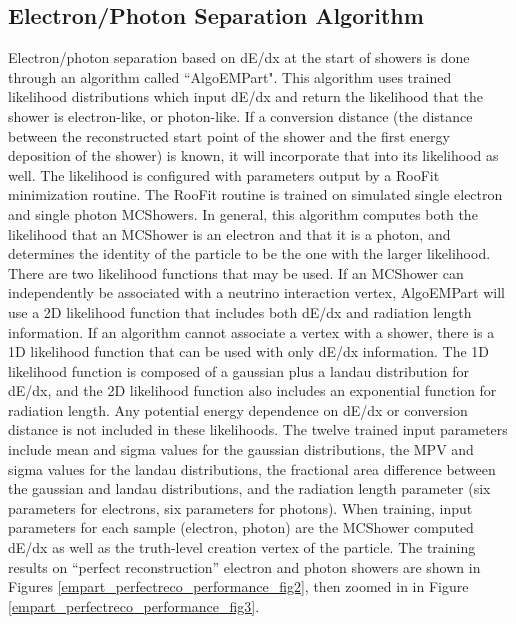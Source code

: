 \subsection{Electron/Photon Separation Algorithm}\label{algoempart_section}
Electron/photon separation based on dE/dx at the start of showers is done through an algorithm called ``AlgoEMPart". This algorithm uses trained likelihood distributions which input dE/dx and return the likelihood that the shower is electron-like, or photon-like. If a conversion distance (the distance between the reconstructed start point of the shower and the first energy deposition of the shower) is known, it will incorporate that into its likelihood as well. The likelihood is configured with parameters output by a RooFit \cite{ROOFITsource} minimization routine. The RooFit routine is trained on simulated single electron and single photon {\sc MCShowers}. In general, this algorithm computes both the likelihood that an {\sc MCShower} is an electron and that it is a photon, and determines the identity of the particle to be the one with the larger likelihood.\\

There are two likelihood functions that may be used. If an {\sc MCShower} can independently be associated with a neutrino interaction vertex, AlgoEMPart will use a 2D likelihood function that includes both dE/dx and radiation length information. If an algorithm cannot associate a vertex with a shower, there is a 1D likelihood function that can be used with only dE/dx information. The 1D likelihood function is composed of a gaussian plus a landau distribution for dE/dx, and the 2D likelihood function also includes an exponential function for radiation length. Any potential energy dependence on dE/dx or conversion distance is not included in these likelihoods. The twelve trained input parameters include mean and sigma values for the gaussian distributions, the MPV and sigma values for the landau distributions, the fractional area difference between the gaussian and landau distributions, and the radiation length parameter (six parameters for electrons, six parameters for photons). When training, input parameters for each sample (electron, photon) are the {\sc MCShower} computed dE/dx as well as the truth-level creation vertex of the particle. The training results on ``perfect reconstruction'' electron and photon showers are shown in Figures \ref{empart_perfectreco_performance_fig2}, then zoomed in in Figure \ref{empart_perfectreco_performance_fig3}.

